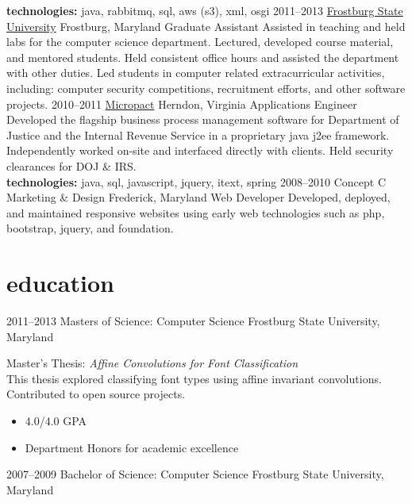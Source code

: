 \documentclass[]{friggeri-cv} %
\begin{document}
\begin{entrylist}
{	\textbf{technologies:} java, rabbitmq, sql, aws (s3), xml, osgi
}
\entry
{2011--2013}
{\href{http://www.frostburg.edu/}{Frostburg State University}}
{Frostburg, Maryland}
{Graduate Assistant}
{
	Assisted in teaching and held labs for the computer science department. Lectured, developed course material, and mentored students. Held consistent office hours and assisted the department with other duties. Led students in computer related extracurricular activities, including: computer security competitions, recruitment efforts, and other software projects.
}
\entry
{2010--2011}
{\href{https://www.micropact.com/}{Micropact}}
{Herndon, Virginia}
{Applications Engineer}
{
Developed the flagship business process management software for Department of Justice and the Internal Revenue Service in a proprietary java j2ee framework. Independently worked on-site and interfaced directly with clients. Held security clearances for DOJ \& IRS.\\
\textbf{technologies:} java, sql, javascript, jquery, itext, spring
}
\entry
{2008--2010}
{Concept C Marketing \& Design}
{Frederick, Maryland}
{Web Developer}
{
	Developed, deployed, and maintained responsive websites using early web technologies such as php, bootstrap, jquery, and foundation.
}

\end{entrylist}

\section{education}

\begin{entrylist}
\entryFour
{2011--2013}
{Masters {\normalfont of Science: Computer Science}}
{Frostburg State University, Maryland}
{
Master's Thesis: \emph{Affine Convolutions for Font Classification} \\ This thesis explored classifying font types using affine invariant convolutions. \\
Contributed to open source projects.
	\begin{itemize}
	\item 4.0/4.0 GPA
	\item Department Honors for academic excellence 
	\end{itemize}
}
\entryFour
{2007--2009}
{Bachelor {\normalfont of Science: Computer Science}}
{Frostburg State University, Maryland}
{}

\end{entrylist}
\end{document}
